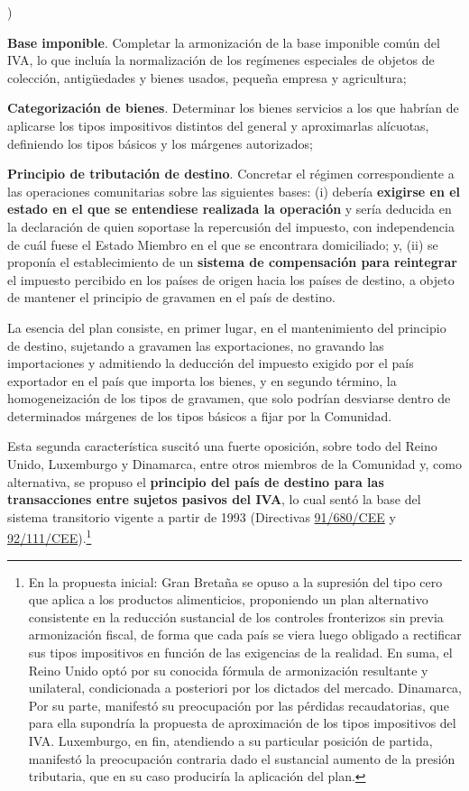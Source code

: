 \documentclass[10pt,a4paper]{article}
\newcounter{alphaitem}
\newenvironment{la}
      {\begin{list}{\alph{alphaitem})}{%
          \usecounter{alphaitem}%
          \setlength{\leftmargin}{1cm}%
          \setlength{\parskip}{3pt}%
          \setlength{\itemsep}{0pt}%
          \setlength{\parsep}{0pt}%
      }}
      {\end{list}}
\begin{document}
\begin{la}
    \item \textbf{Base imponible}. Completar la armonización de la base imponible común del IVA, lo que incluía la normalización de los regímenes especiales de objetos de colección, antigüedades y bienes usados, pequeña empresa y agricultura;
    \item \textbf{Categorización de bienes}. Determinar los bienes servicios a los que habrían de aplicarse los tipos impositivos distintos del general y aproximarlas alícuotas, definiendo los tipos básicos y los márgenes autorizados;
    \item \textbf{Principio de tributación de destino}. Concretar el régimen correspondiente a las operaciones comunitarias sobre las siguientes bases: (i) debería \textbf{exigirse en el estado en el que se entendiese realizada la operación} y sería deducida en la declaración de quien soportase la repercusión del impuesto, con independencia de cuál fuese el Estado Miembro en el que se encontrara domiciliado; y, (ii) se proponía el establecimiento de un \textbf{sistema de compensación para reintegrar} el impuesto percibido en los países de origen hacia los países de destino, a objeto de mantener el principio de gravamen en el país de destino.
\end{la}

La esencia del plan consiste, en primer lugar, en el mantenimiento del principio de destino, sujetando a gravamen las exportaciones, no gravando las importaciones y admitiendo la deducción del impuesto exigido por el país exportador en el país que importa los bienes, y en segundo término, la homogeneización de los tipos de gravamen, que solo podrían desviarse dentro de determinados márgenes de los tipos básicos a fijar por la Comunidad. 

Esta segunda característica suscitó una fuerte oposición, sobre todo del Reino Unido, Luxemburgo y Dinamarca, entre otros miembros de la Comunidad y, como alternativa, se propuso el \textbf{principio del país de destino para las transacciones entre sujetos pasivos del IVA}, lo cual sentó la base del sistema transitorio vigente a partir de 1993 (Directivas \href{https://eur-lex.europa.eu/legal-content/ES/ALL/?uri=CELEX:31991L0680}{91/680/CEE} y \href{https://eur-lex.europa.eu/legal-content/ES/ALL/?uri=CELEX:31992L0111}{92/111/CEE}).\footnote{%
    En la propuesta inicial: Gran Bretaña se opuso a la supresión del tipo cero que aplica a los productos alimenticios, proponiendo un plan alternativo consistente en la reducción sustancial de los controles fronterizos sin previa armonización fiscal, de forma que cada país se viera luego obligado a rectificar sus tipos impositivos en función de las exigencias de la realidad. En suma, el Reino Unido optó por su conocida fórmula de armonización resultante y unilateral, condicionada a posteriori por los dictados del mercado. Dinamarca, Por su parte, manifestó su preocupación por las pérdidas recaudatorias, que para ella supondría la propuesta de aproximación de los tipos impositivos del IVA. Luxemburgo, en fin, atendiendo a su particular posición de partida, manifestó la preocupación contraria dado el sustancial aumento de la presión tributaria, que en su caso produciría la aplicación del plan.
}
\end{document}
